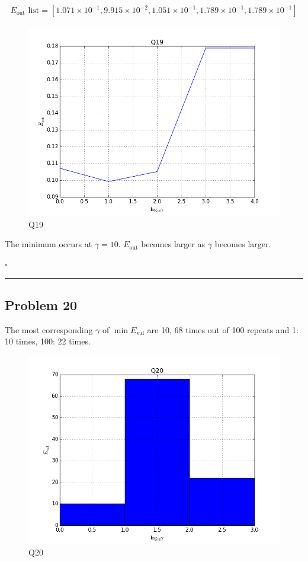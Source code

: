 \documentclass[12pt]{article}
\newcommand*{\QEDB}{\hfill\ensuremath{\square}}
\newcommand{\SBrackets}[1]{\left[#1\right]}
\newcommand{\SciNum}[2]{#1\times{10}^{#2}}
\newcommand{\horrule}[1]{\rule{\linewidth}{#1}}
\begin{document}
\begin{align}
E_{\text{out}}\text{ list}=\SBrackets{\SciNum{1.071}{-1}, \SciNum{9.915}{-2}, \SciNum{1.051}{-1}, \SciNum{1.789}{-1}, \SciNum{1.789}{-1}}
\end{align}
\begin{figure}[H]
	\centering
	\includegraphics[scale=0.5]{Q19.png}
	\caption{Q19}
	\label{Q19}
\end{figure}
The minimum occurs at $\gamma=10$. $E_{\text{out}}$ becomes larger as $\gamma$ becomes larger.

\QEDB

\horrule{0.5pt}

\subsection*{Problem 20}

The most corresponding $\gamma$ of $\min E_{\text{val}}$ are 10, 68 times out of 100 repeats and 1: 10 times, 100: 22 times.
\begin{figure}[H]
	\centering
	\includegraphics[scale=0.5]{Q20.png}
	\caption{Q20}
	\label{Q20}
\end{figure}
\end{document}
